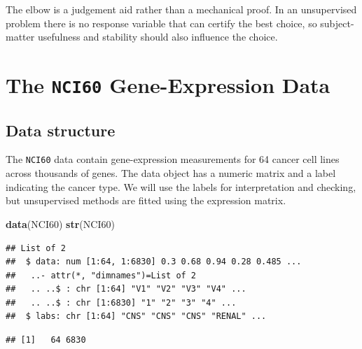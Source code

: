 \documentclass[
  11pt,
]{article}
\newenvironment{Shaded}{\begin{snugshade}}{\end{snugshade}}
\newcommand{\FunctionTok}[1]{\textcolor[rgb]{0.13,0.29,0.53}{\textbf{#1}}}
\newcommand{\NormalTok}[1]{#1}
\newcommand{\SpecialCharTok}[1]{\textcolor[rgb]{0.81,0.36,0.00}{\textbf{#1}}}
\begin{document}
The elbow is a judgement aid rather than a mechanical proof. In an
unsupervised problem there is no response variable that can certify the
best choice, so subject-matter usefulness and stability should also
influence the choice.

\section{\texorpdfstring{The \texttt{NCI60} Gene-Expression
Data}{The NCI60 Gene-Expression Data}}\label{the-nci60-gene-expression-data}

\subsection{Data structure}\label{data-structure}

The \texttt{NCI60} data contain gene-expression measurements for 64
cancer cell lines across thousands of genes. The data object has a
numeric matrix and a label indicating the cancer type. We will use the
labels for interpretation and checking, but unsupervised methods are
fitted using the expression matrix.

\begin{Shaded}
\begin{Highlighting}[]
\FunctionTok{data}\NormalTok{(NCI60)}
\FunctionTok{str}\NormalTok{(NCI60)}
\end{Highlighting}
\end{Shaded}

\begin{verbatim}
## List of 2
##  $ data: num [1:64, 1:6830] 0.3 0.68 0.94 0.28 0.485 ...
##   ..- attr(*, "dimnames")=List of 2
##   .. ..$ : chr [1:64] "V1" "V2" "V3" "V4" ...
##   .. ..$ : chr [1:6830] "1" "2" "3" "4" ...
##  $ labs: chr [1:64] "CNS" "CNS" "CNS" "RENAL" ...
\end{verbatim}

\begin{Shaded}
\end{Shaded}

\begin{verbatim}
## [1]   64 6830
\end{verbatim}

\begin{Shaded}
\end{Shaded}
\end{document}
